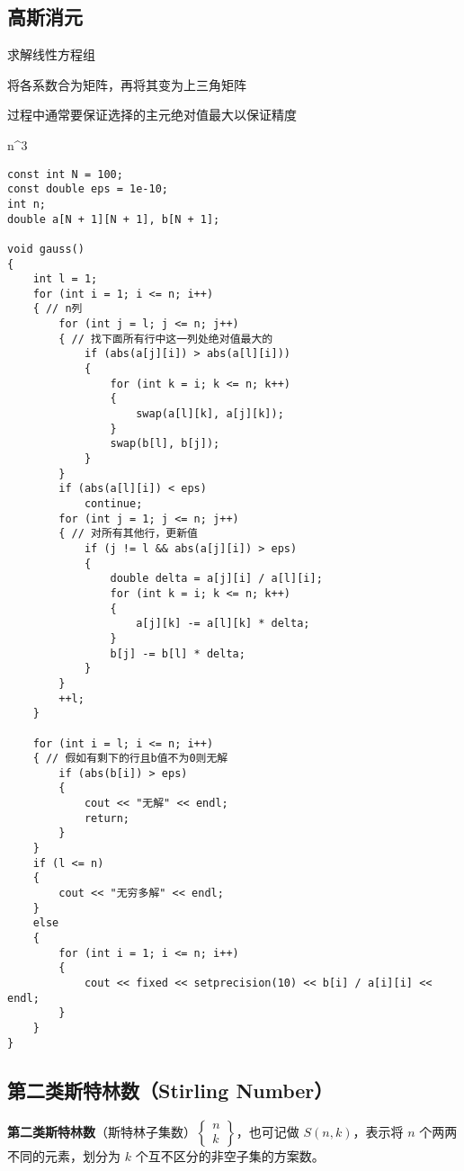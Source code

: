 \documentclass[]{article}
\begin{document}
\hypertarget{ux9ad8ux65afux6d88ux5143}{%
\subsection{高斯消元}\label{ux9ad8ux65afux6d88ux5143}}

求解线性方程组

将各系数合为矩阵，再将其变为上三角矩阵

过程中通常要保证选择的主元绝对值最大以保证精度

n\^{}3

\begin{verbatim}
const int N = 100;
const double eps = 1e-10;
int n;
double a[N + 1][N + 1], b[N + 1];

void gauss()
{
    int l = 1;
    for (int i = 1; i <= n; i++)
    { // n列
        for (int j = l; j <= n; j++)
        { // 找下面所有行中这一列处绝对值最大的
            if (abs(a[j][i]) > abs(a[l][i]))
            {
                for (int k = i; k <= n; k++)
                {
                    swap(a[l][k], a[j][k]);
                }
                swap(b[l], b[j]);
            }
        }
        if (abs(a[l][i]) < eps)
            continue;
        for (int j = 1; j <= n; j++)
        { // 对所有其他行，更新值
            if (j != l && abs(a[j][i]) > eps)
            {
                double delta = a[j][i] / a[l][i];
                for (int k = i; k <= n; k++)
                {
                    a[j][k] -= a[l][k] * delta;
                }
                b[j] -= b[l] * delta;
            }
        }
        ++l;
    }

    for (int i = l; i <= n; i++)
    { // 假如有剩下的行且b值不为0则无解
        if (abs(b[i]) > eps)
        {
            cout << "无解" << endl;
            return;
        }
    }
    if (l <= n)
    {
        cout << "无穷多解" << endl;
    }
    else
    {
        for (int i = 1; i <= n; i++)
        {
            cout << fixed << setprecision(10) << b[i] / a[i][i] << endl;
        }
    }
}
\end{verbatim}

\hypertarget{ux7b2cux4e8cux7c7bux65afux7279ux6797ux6570stirling-number}{%
\subsection{第二类斯特林数（Stirling
Number）}\label{ux7b2cux4e8cux7c7bux65afux7279ux6797ux6570stirling-number}}

\textbf{第二类斯特林数}（斯特林子集数）\(\begin{Bmatrix}n\\ k\end{Bmatrix}\)，也可记做
\(S(n,k)\)，表示将 \(n\) 个两两不同的元素，划分为 \(k​\)
个互不区分的非空子集的方案数。
\end{document}
